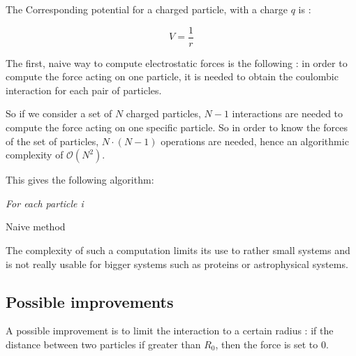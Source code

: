 \documentclass[11pt,twoside,a4paper]{report}
\begin{document}
The Corresponding potential for a charged particle, with a charge $q$ is :

\begin{equation}
	V = \frac{1}{r}
	\label{potential}
\end{equation}



The first, naive way to compute electrostatic forces is the following : in order to compute the force acting on one particle, it is needed to obtain the coulombic interaction for each pair of particles.

So if we consider a set of $N$ charged particles, $N-1$ interactions are needed to compute the force acting on one specific particle. So in order to know the forces of the set of particles, $N\cdot(N-1)$ operations are needed, hence an algorithmic complexity of $\mathcal{O}(N^2)$.

This gives the following algorithm:



\IncMargin{1em}
\begin{algorithm}[H]



\BlankLine

\emph{For each particle i}\;
\caption{Naive method}\label{algo_disjdecomp}
\end{algorithm}\DecMargin{1em}


The complexity of such a computation limits its use to rather small systems and is not really usable for bigger systems such as proteins or astrophysical systems.


\subsection{Possible improvements}

A possible improvement is to limit the interaction to a certain radius : if the distance between two particles if greater than $R_0$, then the force is set to $0$.
\end{document}

